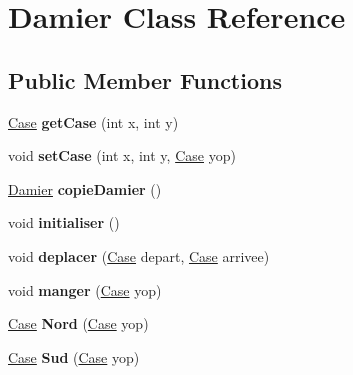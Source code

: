 \hypertarget{class_damier}{}\section{Damier Class Reference}
\label{class_damier}
\subsection*{Public Member Functions}
\begin{DoxyCompactItemize}
\item 
\hyperlink{class_case}{Case} {\bfseries get\+Case} (int x, int y)\hypertarget{class_damier_a8103d1111efad33bf34d96776c69da8b}{}\label{class_damier_a8103d1111efad33bf34d96776c69da8b}

\item 
void {\bfseries set\+Case} (int x, int y, \hyperlink{class_case}{Case} yop)\hypertarget{class_damier_a55fe727de5bca3f52824306b5a346bee}{}\label{class_damier_a55fe727de5bca3f52824306b5a346bee}

\item 
\hyperlink{class_damier}{Damier} {\bfseries copie\+Damier} ()\hypertarget{class_damier_a8b0caf22e0988e8f9ea8ded7929f856f}{}\label{class_damier_a8b0caf22e0988e8f9ea8ded7929f856f}

\item 
void {\bfseries initialiser} ()\hypertarget{class_damier_a3d6f1e06e2626618397cc6fbec2a588b}{}\label{class_damier_a3d6f1e06e2626618397cc6fbec2a588b}

\item 
void {\bfseries deplacer} (\hyperlink{class_case}{Case} depart, \hyperlink{class_case}{Case} arrivee)\hypertarget{class_damier_a6abc997fa2c561dd41d721c9752a4804}{}\label{class_damier_a6abc997fa2c561dd41d721c9752a4804}

\item 
void {\bfseries manger} (\hyperlink{class_case}{Case} yop)\hypertarget{class_damier_ad11d7a281b1f3beb869710e24a275c12}{}\label{class_damier_ad11d7a281b1f3beb869710e24a275c12}

\item 
\hyperlink{class_case}{Case} {\bfseries Nord} (\hyperlink{class_case}{Case} yop)\hypertarget{class_damier_ab0eabeab7fcfa1c1e43e8a696f3b82e6}{}\label{class_damier_ab0eabeab7fcfa1c1e43e8a696f3b82e6}

\item 
\hyperlink{class_case}{Case} {\bfseries Sud} (\hyperlink{class_case}{Case} yop)\hypertarget{class_damier_a78ff2eb41c02ec2f6e68219746e38219}{}\label{class_damier_a78ff2eb41c02ec2f6e68219746e38219}


\end{DoxyCompactItemize}
